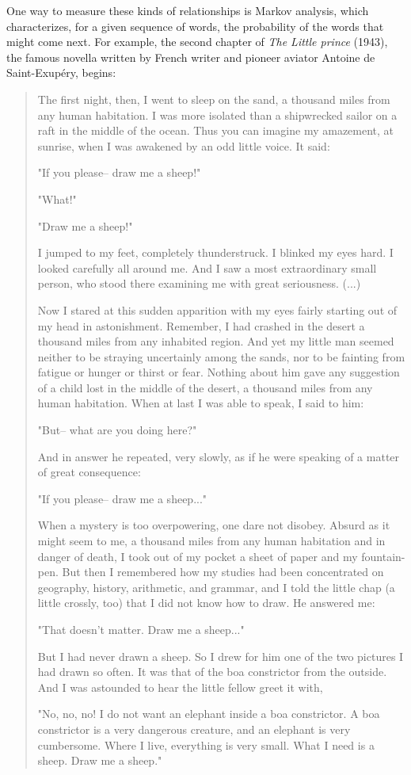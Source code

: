 One way to measure these kinds of relationships is Markov
analysis, which characterizes, for a given sequence of words, 
the probability of the words that might come next.  For example, 
the second chapter of \emph{The Little prince} (1943), the 
famous novella written by French writer and pioneer aviator 
Antoine de Saint-Exupéry, begins:

\begin{quote}
The first night, then, I went to sleep on the sand, a thousand miles from any human habitation. I was more isolated than a shipwrecked sailor on a raft in the middle of the ocean. Thus you can imagine my amazement, at sunrise, when I was awakened by an odd little voice. It said:

 "If you please-- draw me a sheep!"

 "What!"

 "Draw me a sheep!"

 I jumped to my feet, completely thunderstruck. I blinked my eyes hard. I looked carefully all around me. And I saw a most extraordinary small person, who stood there examining me with great seriousness. (...) 

 Now I stared at this sudden apparition with my eyes fairly starting out of my head in astonishment. Remember, I had crashed in the desert a thousand miles from any inhabited region. And yet my little man seemed neither to be straying uncertainly among the sands, nor to be fainting from fatigue or hunger or thirst or fear. Nothing about him gave any suggestion of a child lost in the middle of the desert, a thousand miles from any human habitation. When at last I was able to speak, I said to him:

 "But-- what are you doing here?"

 And in answer he repeated, very slowly, as if he were speaking of a matter of great consequence:

 "If you please-- draw me a sheep..."

 When a mystery is too overpowering, one dare not disobey. Absurd as it might seem to me, a thousand miles from any human habitation and in danger of death, I took out of my pocket a sheet of paper and my fountain-pen. But then I remembered how my studies had been concentrated on geography, history, arithmetic, and grammar, and I told the little chap (a little crossly, too) that I did not know how to draw. He answered me:

 "That doesn't matter. Draw me a sheep..."

 But I had never drawn a sheep. So I drew for him one of the two pictures I had drawn so often. It was that of the boa constrictor from the outside. And I was astounded to hear the little fellow greet it with,

 "No, no, no! I do not want an elephant inside a boa constrictor. A boa constrictor is a very dangerous creature, and an elephant is very cumbersome. Where I live, everything is very small. What I need is a sheep. Draw me a sheep." 
  
\end{quote}
